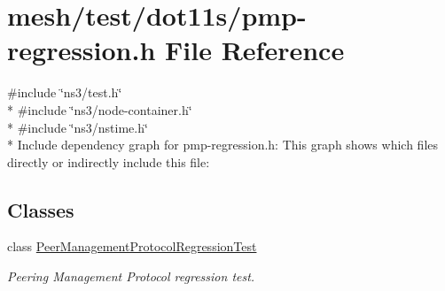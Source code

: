 \hypertarget{pmp-regression_8h}{}\section{mesh/test/dot11s/pmp-\/regression.h File Reference}
\label{pmp-regression_8h}
{\ttfamily \#include \char`\"{}ns3/test.\+h\char`\"{}}\\*
{\ttfamily \#include \char`\"{}ns3/node-\/container.\+h\char`\"{}}\\*
{\ttfamily \#include \char`\"{}ns3/nstime.\+h\char`\"{}}\\*
Include dependency graph for pmp-\/regression.h\+:
This graph shows which files directly or indirectly include this file\+:
\subsection*{Classes}
\begin{DoxyCompactItemize}
\item 
class \hyperlink{classPeerManagementProtocolRegressionTest}{Peer\+Management\+Protocol\+Regression\+Test}
\begin{DoxyCompactList}\small\item\em Peering Management Protocol regression test. \end{DoxyCompactList}\end{DoxyCompactItemize}
